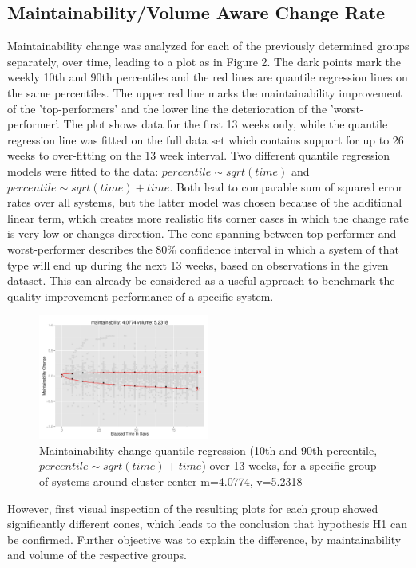 \subsection{Maintainability/Volume Aware Change Rate}
Maintainability change was analyzed for each of the previously determined groups separately, over time, leading to a plot as in Figure 2. The dark points mark the weekly 10th and 90th percentiles and the red lines are quantile regression lines on the same percentiles. The upper red line marks the maintainability improvement of the 'top-performers' and the lower line the deterioration of the 'worst-performer'. The plot shows data for the first 13 weeks only, while the quantile regression line was fitted on the full data set which contains support for up to 26 weeks to over-fitting on the 13 week interval. Two different quantile regression models were fitted to the data: \(percentile\sim sqrt(time)\) and \(percentile\sim sqrt(time)+time\). Both lead to comparable sum of squared error rates over all systems, but the latter model was chosen because of the additional linear term, which creates more realistic fits corner cases in which the change rate is very low or changes direction. 
The cone spanning between top-performer and worst-performer describes the 80\% confidence interval in which a system of that type will end up during the next 13 weeks, based on observations in the given dataset. This can already be considered as a useful approach to benchmark the quality improvement performance of a specific system.
\begin{figure}[htbp!]
  \label{cone}
  \centering
  \includegraphics[width=0.5\textwidth]{figs/graph_m_4v_5.pdf}
  \caption{Maintainability change quantile regression (10th and 90th percentile, \(percentile\sim sqrt(time)+time\)) over 13 weeks, for a specific group of systems around cluster center m=4.0774, v=5.2318}
\end{figure}
However, first visual inspection of the resulting plots for each group showed significantly different cones, which leads to the conclusion that hypothesis H1 can be confirmed. Further objective was to explain the difference, by maintainability and volume of the respective groups. 
